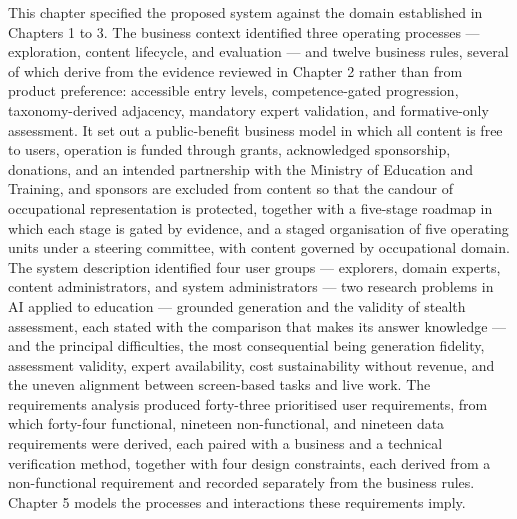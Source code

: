 This chapter specified the proposed system against the domain established in Chapters 1 to 3. The business context identified three operating processes --- exploration, content lifecycle, and evaluation --- and twelve business rules, several of which derive from the evidence reviewed in Chapter 2 rather than from product preference: accessible entry levels, competence-\allowbreak{}gated progression, taxonomy-\allowbreak{}derived adjacency, mandatory expert validation, and formative-\allowbreak{}only assessment. It set out a public-\allowbreak{}benefit business model in which all content is free to users, operation is funded through grants, acknowledged sponsorship, donations, and an intended partnership with the Ministry of Education and Training, and sponsors are excluded from content so that the candour of occupational representation is protected, together with a five-stage roadmap in which each stage is gated by evidence, and a staged organisation of five operating units under a steering committee, with content governed by occupational domain. The system description identified four user groups --- explorers, domain experts, content administrators, and system administrators --- two research problems in AI applied to education --- grounded generation and the validity of stealth assessment, each stated with the comparison that makes its answer knowledge --- and the principal difficulties, the most consequential being generation fidelity, assessment validity, expert availability, cost sustainability without revenue, and the uneven alignment between screen-\allowbreak{}based tasks and live work. The requirements analysis produced forty-three prioritised user requirements, from which forty-four functional, nineteen non-\allowbreak{}functional, and nineteen data requirements were derived, each paired with a business and a technical verification method, together with four design constraints, each derived from a non-\allowbreak{}functional requirement and recorded separately from the business rules. Chapter 5 models the processes and interactions these requirements imply.
